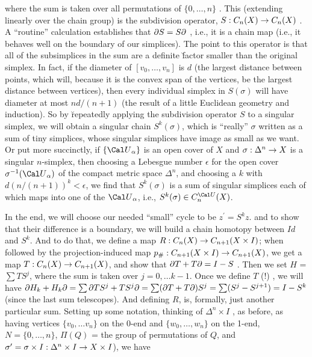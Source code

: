
where the sum is taken over all permutations of $\{0,\ldots ,n\}$ .
This (extending linearly over the chain group) is the subdivision operator, $S:C_n(X)\rightarrow C_n(X)$ . 
A ``routine'' calculation establishes that $\partial S = S\partial$ , i.e., it is a chain map
(i.e., it behaves well on the boundary of our simplices). The point to this operator is that all of the 
subsimplices in the sum are a definite \u{factor} smaller than the original simplex. In fact,
if the diameter of $[v_0,\ldots ,v_n]$ is $d$ (the largest distance between points, which will,
because it is the convex span of the vertices, be the largest distance between vertices), then
every individual simplex in $S(\sigma)$ will have diameter at most $nd/(n+1)$ (the result of a little
Euclidean geometry and induction). So by \u{repeatedly} applying the subdivision operator
$S$ to a singular simplex, we will obtain a singular chain $S^k(\sigma)$,
which is ``really'' $\sigma$ written as a sum of tiny simplices, whose singular simplices 
have image as small as we want. Or put more succinctly, if $\{{\Cal U}_\alpha\}$ is an open cover of $X$
and $\sigma:\Delta^n\rightarrow X$ is a singular $n$-simplex, then choosing a Lebesgue number $\epsilon$ for
the open cover $\sigma^{-1}({\Cal U}_\alpha)$ of the compact metric space $\Delta^n$, and choosing 
a $k$ with $d(n/(n+1))^k<\epsilon$, we find that $S^k(\sigma)$ is a sum of singular simplices
each of which maps into one of the ${\Cal U}_\alpha$, i.e., $S^k(\sigma)\in C_n^{\Cal U}(X)$.

\vfill
\eject

In the end, we will choose our needed ``small'' cycle to be $z^\prime = S^k z$. and to show that their difference
is a boundary, we will build a chain homotopy between $Id$ and $S^k$.
And to do \u{that}, we define a map $R:C_n(X)\rightarrow C_{n+1}(X\times I)$; when followed by the projection-induced
map $p_\# : C_{n+1}(X\times I)\rightarrow C_{n+1}(X)$, we get a map $T:C_n(X)\rightarrow C_{n+1}(X)$,
and show that $\partial T + T\partial = I-S$ .
Then we set $H$ = $\sum TS^j$, where the sum is taken over $j=0,\ldots k-1$. Once we define $T$ (!) , we will have
$\partial H_k+H_k\partial = \sum \partial TS^j + TS^j \partial = \sum (\partial T+T\partial) S^j =\sum (S^j-S^{j+1}) = I-S^k$
(since the last sum telescopes). And defining $R$, is, formally, just another particular sum.
Setting up some notation,
thinking of $\Delta^n\times I$ , as before, as having vertices $\{v_0,\ldots v_n\}$ on the 0-end and 
$\{w_0,\ldots ,w_n\}$ on the 1-end,  $N=\{0,\ldots ,n\}$, $\Pi(Q)$ = the group of permutations of $Q$,
and $\sigma^\prime = \sigma\times I:\Delta^n\times I\rightarrow X\times I$), we have

